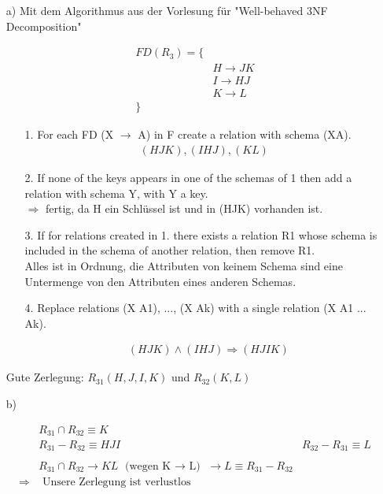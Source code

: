 \begin{enumerate}

\item[a)]
Mit dem Algorithmus aus der Vorlesung für "Well-behaved 3NF Decomposition"

\begin{align*}
    FD(R_3) = \{ & \\
    & H \rightarrow JK \\
    & I \rightarrow HJ \\
    & K \rightarrow L \\
    \} &
\end{align*}

\begin{enumerate}
\item[1.] For each FD (X $\rightarrow$ A) in F 
create a relation with schema (XA). \\

\begin{align*}
    (HJK), (IHJ), (KL)
\end{align*}

\item[2.] If none of the keys appears in one of the schemas of 1
then add a relation with schema Y, with Y a key. \\

$\Rightarrow$ fertig, da H ein Schlüssel ist und in (HJK) vorhanden ist.

\item[3.] If for relations created in 1. there exists a relation R1 whose
schema is included in the schema of another relation, then remove
R1. \\

Alles ist in Ordnung, die Attributen von keinem Schema sind eine Untermenge von den Attributen eines anderen Schemas.

\item[4.] Replace relations (X A1), ..., (X Ak)
with a single relation (X A1 ... Ak).

\begin{align*}
     & (HJK) \land (IHJ) \Rightarrow (HJIK)
\end{align*}

\end{enumerate}



Gute Zerlegung: $R_{31}(H,J,I,K)$ und $R_{32}(K,L)$

\item[b)]

\begin{align*}
    & R_{31} \cap R_{32} \equiv K \\
    & R_{31} - R_{32} \equiv HJI
    & R_{32} - R_{31} \equiv L \\ \\
    & R_{31} \cap R_{32} \rightarrow KL  \text{ (wegen K $\rightarrow$ L) }
        \rightarrow L \equiv R_{31} - R_{32} \\
    \Rightarrow & \text{ Unsere Zerlegung ist verlustlos} 
\end{align*}


\end{enumerate}
